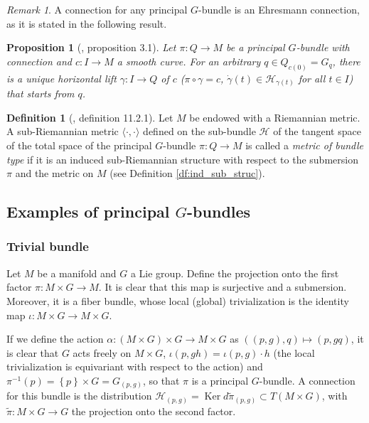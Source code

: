 \documentclass[12pt, letterpaper, reqno]{amsart}
\theoremstyle{definition}
\newtheorem{df}{Definition}
\theoremstyle{plain}
\newtheorem{prop}{Proposition}
\theoremstyle{remark}
\newtheorem{rem}{Remark}
\begin{document}
\begin{rem}
A connection for any principal $ G $-bundle is an Ehresmann connection, as it is stated in the following result. 
\end{rem}
\begin{prop}[\cite{kobayashi1963foundations}, proposition 3.1]\label{prop:comp_bundle}
	Let $ \pi: Q \rightarrow M $ be a principal $ G $-bundle with connection and $ c: I \rightarrow M $ a smooth curve. For an arbitrary $ q\in Q_{c(0)}= G_q $, there is a unique horizontal lift $ \gamma: I \rightarrow Q $ of $ c $ ($\pi\circ\gamma =c$, $ \dot{\gamma}(t)\in \mathcal{H}_{\gamma(t)} $ for all $ t\in I $) that starts from $ q $.    	
\end{prop}

\begin{df}[\cite{montgomery2002tour}, definition 11.2.1]
	Let $ M $ be endowed with a Riemannian metric. A sub-Riemannian metric $  \langle\cdot,\cdot\rangle $ defined on the sub-bundle $ \mathcal{H} $  of the tangent space of the total space of the principal $ G $-bundle $ \pi: Q \rightarrow {M}
	$ is called a \textit{metric of bundle type} if it is an induced sub-Riemannian structure with respect to the submersion $ \pi $ and the metric on $ M $  (see Definition \ref{df:ind_sub_struc}).
\end{df}

\subsection{Examples of principal $ G $-bundles}%
\label{sub:examples_of_principal_g_bundles}

\subsubsection{Trivial bundle}%
\label{ssub:projection_of_cartesian_product_of_manifolds}

Let $ M$ be a manifold and $ G $ a Lie group. Define the projection onto the first factor $ \pi: M\times G \rightarrow M. $ It is clear that this map is surjective and a submersion. Moreover, it is a fiber bundle, whose local (global) trivialization is the identity map $ \iota : M\times G \rightarrow M\times G $.   

If we define the action $ \alpha: (M\times G) \times G \rightarrow M\times G $ as $ ((p, g),q)\mapsto (p,gq)  $, it is clear that $ G $ acts freely on $ M\times G $, $\iota(p, gh) = \iota(p,g)\cdot h $ (the local trivialization is equivariant with respect to the action) and $ \pi^{-1}(p) = \left\{ p \right\}\times G = G_{(p,g)} $, so that $ \pi $ is a principal $ G $-bundle. A connection for this bundle is the distribution $ \mathcal{H}_{(p,g)}= \operatorname{Ker} d\tilde{\pi}_(p,g)\subset T(M\times G) $, with $ \tilde{\pi}:M\times G \rightarrow G $ the projection onto the second factor.
\end{document}
